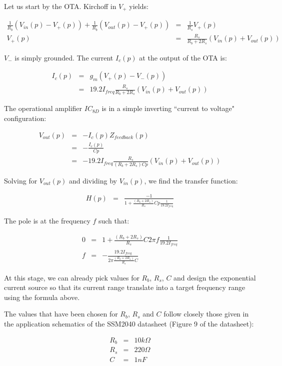 \documentclass[a4paper,11pt]{article}
\begin{document}
Let us start by the OTA. Kirchoff in $V_+$ yields:

\begin{eqnarray}
\frac{1}{R_b}(V_{in}(p) - V_+(p)) + \frac{1}{R_b} (V_{out}(p) - V_+(p)) &=& \frac{1}{R_s} V_+(p) \\
V_+(p) &=& \frac{R_s}{R_b + 2 R_s} (V_{in}(p) + V_{out}(p))
\end{eqnarray}

$V_-$ is simply grounded. The current $I_c(p)$ at the output of the OTA is:

\begin{eqnarray}
I_c(p) &=& g_m (V_+(p) - V_-(p)) \\
 &=& 19.2 I_{freq} \frac{R_s}{R_b + 2 R_s} (V_{in}(p) + V_{out}(p))
\end{eqnarray}

The operational amplifier $IC_{8D}$ is in a simple inverting ``current to voltage" configuration:

\begin{eqnarray}
V_{out}(p) &=& - I_c(p) Z_{feedback}(p) \\
 &=& - \frac{I_c(p)}{Cp} \\
 &=& - 19.2 I_{freq} \frac{R_s}{(R_b + 2 R_s)Cp} (V_{in}(p) + V_{out}(p))
\end{eqnarray}

Solving for $V_{out}(p)$ and dividing by $V_{in}(p)$, we find the transfer function:

\begin{eqnarray}
H(p) &=& \frac{-1}{1 + \frac{(R_b + 2 R_s)}{R_s} Cp \frac{1}{19.2 I_{freq}}}
\end{eqnarray}

The pole is at the frequency $f$ such that:

\begin{eqnarray}
0 &=& 1 + \frac{(R_b + 2 R_s)}{R_s} C 2\pi f \frac{1}{19.2 I_{freq}} \\
f &=& -\frac{19.2 I_{freq}}{2 \pi \frac{(R_b + 2 R_s)}{R_s} C}
\end{eqnarray}

At this stage, we can already pick values for $R_b$, $R_s$, $C$ and design the exponential current source so that its current range translate into a target frequency range using the formula above.

The values that have been chosen for $R_b$, $R_s$ and $C$ follow closely those given in the application schematics of the SSM2040 datasheet (Figure 9 of the datasheet):

\begin{eqnarray*}
R_b &=& 10 k \Omega \\
R_s &=& 220 \Omega \\
C &=& 1 nF
\end{eqnarray*}
\end{document}
